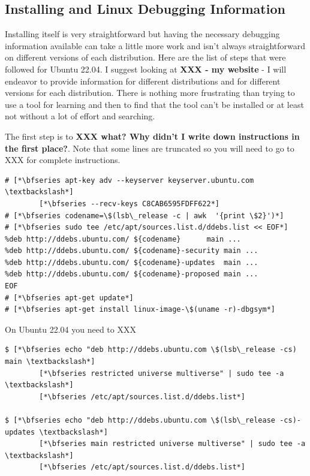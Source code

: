 \subsection{Installing  and Linux Debugging Information}

Installing  itself is very straightforward but having the necessary debugging information available can take a little more work and isn't always straightforward on different versions of each distribution. Here are the list of steps that were followed for Ubuntu 22.04. I suggest looking at \textbf{XXX - my website} - I will endeavor to provide information for different distributions and for different versions for each distribution. There is nothing more frustrating than trying to use a tool for learning and then to find that the tool can't be installed or at least not without a lot of effort and searching.


The first step is to \textbf{XXX what? Why didn't I write down instructions in the first place?}. Note that some lines are truncated so you will need to go to XXX for complete instructions.

\begin{lstlisting}
# [*\bfseries apt-key adv --keyserver keyserver.ubuntu.com \textbackslash*]
        [*\bfseries --recv-keys C8CAB6595FDFF622*]
# [*\bfseries codename=\$(lsb\_release -c | awk  '{print \$2}')*]
# [*\bfseries sudo tee /etc/apt/sources.list.d/ddebs.list << EOF*]
%deb http://ddebs.ubuntu.com/ ${codename}      main ...
%deb http://ddebs.ubuntu.com/ ${codename}-security main ...
%deb http://ddebs.ubuntu.com/ ${codename}-updates  main ...
%deb http://ddebs.ubuntu.com/ ${codename}-proposed main ...
EOF
# [*\bfseries apt-get update*]
# [*\bfseries apt-get install linux-image-\$(uname -r)-dbgsym*]
\end{lstlisting}

\noindent
On Ubuntu 22.04 you need to XXX

\begin{lstlisting}
$ [*\bfseries echo "deb http://ddebs.ubuntu.com \$(lsb\_release -cs) main \textbackslash*]
        [*\bfseries restricted universe multiverse" | sudo tee -a  \textbackslash*]
        [*\bfseries /etc/apt/sources.list.d/ddebs.list*]

$ [*\bfseries echo "deb http://ddebs.ubuntu.com \$(lsb\_release -cs)-updates \textbackslash*]
        [*\bfseries main restricted universe multiverse" | sudo tee -a \textbackslash*]
        [*\bfseries /etc/apt/sources.list.d/ddebs.list*]
\end{lstlisting}

